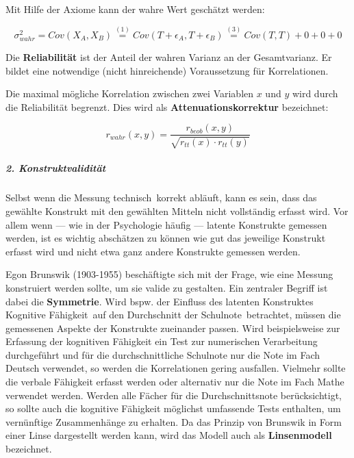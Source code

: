 \documentclass{article}
\numberwithin{equation}{section}
\begin{document}
Mit Hilfe der Axiome kann der wahre Wert geschätzt werden:

\begin{equation}
\sigma^2_{wahr} = Cov(X_A,X_B) \overset{(1)}{=} Cov(T+\epsilon_A,T+\epsilon_B) \overset{(3)}{=} Cov(T,T) + 0 + 0 + 0
\end{equation}

Die \textbf{Reliabilität} ist der Anteil der wahren Varianz an der Gesamtvarianz. Er bildet eine notwendige (nicht hinreichende) Voraussetzung für Korrelationen.

Die maximal mögliche Korrelation zwischen zwei Variablen $x$ und $y$ wird durch die Reliabilität begrenzt. Dies wird als \textbf{Attenuationskorrektur} bezeichnet:

\begin{equation}
\label{eq:korr-rel}
r_{wahr}(x,y) = \frac{r_{beob}(x,y)}{\sqrt{r_{tt}(x) \cdot r_{tt}(y)}}
\end{equation}

\subparagraph{2. Konstruktvalidität}

Selbst wenn die Messung \glqq technisch\grqq\ korrekt abläuft, kann es sein, dass das gewählte Konstrukt mit den gewählten Mitteln nicht vollständig erfasst wird. Vor allem wenn --- wie in der Psychologie häufig --- latente Konstrukte gemessen werden, ist es wichtig abschätzen zu können wie gut das jeweilige Konstrukt erfasst wird und nicht etwa ganz andere Konstrukte gemessen werden.

Egon Brunswik (1903-1955) beschäftigte sich mit der Frage, wie eine Messung konstruiert werden sollte, um sie valide zu gestalten. Ein zentraler Begriff ist dabei die \textbf{Symmetrie}. Wird bspw. der Einfluss des latenten Konstruktes \glqq Kognitive Fähigkeit\grqq\ auf den \glqq Durchschnitt der Schulnote\grqq\ betrachtet, müssen die gemessenen Aspekte der Konstrukte zueinander passen. Wird beispielsweise zur Erfassung der kognitiven Fähigkeit ein Test zur numerischen Verarbeitung durchgeführt und für die durchschnittliche Schulnote nur die Note im Fach Deutsch verwendet, so werden die Korrelationen gering ausfallen. Vielmehr sollte die verbale Fähigkeit erfasst werden oder alternativ nur die Note im Fach Mathe verwendet werden. Werden alle Fächer für die Durchschnittsnote berücksichtigt, so sollte auch die kognitive Fähigkeit möglichst umfassende Tests enthalten, um vernünftige Zusammenhänge zu erhalten. Da das Prinzip von Brunswik in Form einer Linse dargestellt werden kann, wird das Modell auch als \textbf{Linsenmodell} bezeichnet.
\end{document}

